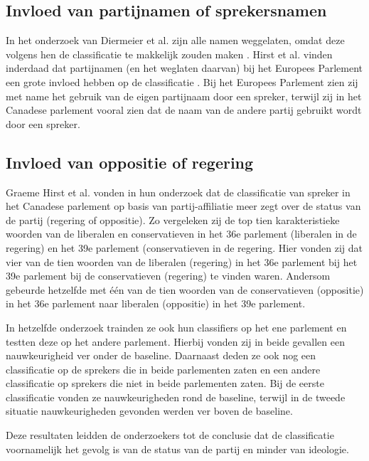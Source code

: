 \subsection{Invloed van partijnamen of sprekersnamen}
In het onderzoek van Diermeier et al. zijn alle namen weggelaten, omdat deze volgens hen de classificatie te makkelijk zouden maken \cite{diermeier_godbout_yu_kaufmann_2012}. Hirst et al. vinden inderdaad dat partijnamen (en het weglaten daarvan) bij het Europees Parlement een grote invloed hebben op de classificatie \cite{Hirst_textto}. Bij het Europees Parlement zien zij met name het gebruik van de eigen partijnaam door een spreker, terwijl zij in het Canadese parlement vooral zien dat de naam van de andere partij gebruikt wordt door een spreker.

\subsection{Invloed van oppositie of regering}
Graeme Hirst et al. vonden in hun onderzoek dat de classificatie van spreker in het Canadese parlement op basis van partij-affiliatie meer zegt over de status van de partij (regering of oppositie).\cite{Hirst_textto} Zo vergeleken zij de top tien karakteristieke woorden van de liberalen en conservatieven in het 36e parlement (liberalen in de regering) en het 39e parlement (conservatieven in de regering. Hier vonden zij dat vier van de tien woorden van de liberalen (regering) in het 36e parlement bij het 39e parlement bij de conservatieven (regering) te vinden waren. Andersom gebeurde hetzelfde met één van de tien woorden van de conservatieven (oppositie) in het 36e parlement naar liberalen (oppositie) in het 39e parlement.\par
In hetzelfde onderzoek trainden ze ook hun classifiers op het ene parlement en testten deze op het andere parlement. Hierbij vonden zij in beide gevallen een nauwkeurigheid ver onder de baseline. Daarnaast deden ze ook nog een classificatie op de sprekers die in beide parlementen zaten en een andere classificatie op sprekers die niet in beide parlementen zaten. Bij de eerste classificatie vonden ze nauwkeurigheden rond de baseline, terwijl in de tweede situatie nauwkeurigheden gevonden werden ver boven de baseline. \par
Deze resultaten leidden de onderzoekers tot de conclusie dat de classificatie voornamelijk het gevolg is van de status van de partij en minder van ideologie.\par



